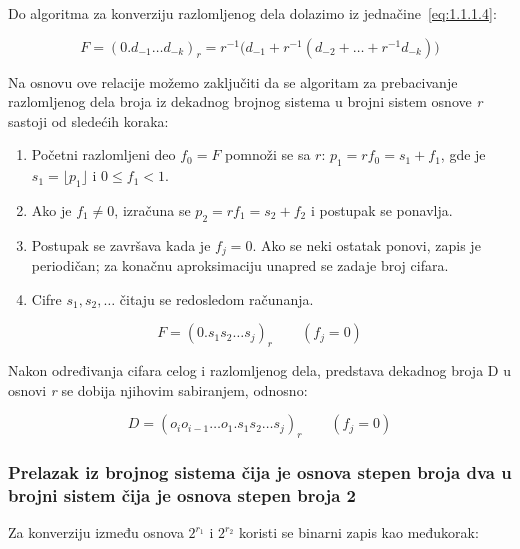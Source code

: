 \documentclass[a4paper,11pt]{article}
\numberwithin{equation}{section}
\begin{document}
Do algoritma za konverziju razlomljenog dela dolazimo iz jednačine~\eqref{eq:1.1.1.4}:

\begin{equation}\label{eq:1.1.1.7}
F=(0.d_{-1}\dots d_{-k})_r=r^{-1}\bigl(d_{-1}+r^{-1}(d_{-2}+\dots+r^{-1}d_{-k})\bigr)
\end{equation}


Na osnovu ove relacije možemo zaključiti da se algoritam za prebacivanje razlomljenog dela broja iz dekadnog brojnog sistema u brojni sistem osnove \emph{r} sastoji od sledećih koraka:



\begin{enumerate}[label=\arabic*),leftmargin=*]
\item Početni razlomljeni deo $f_0=F$ pomnoži se sa $r$: $p_1=rf_0=s_1+f_1$, gde je $s_1=\lfloor p_1\rfloor$ i $0\le f_1<1$.
\item Ako je $f_1\ne0$, izračuna se $p_2=rf_1=s_2+f_2$ i postupak se ponavlja.
\item Postupak se završava kada je $f_j=0$. Ako se neki ostatak ponovi, zapis je periodičan; za konačnu aproksimaciju unapred se zadaje broj cifara.
\item Cifre $s_1,s_2,\dots$ čitaju se redosledom računanja.
\end{enumerate}

\begin{equation}\label{eq:1.1.1.8}
F=(0.s_1s_2\dots s_j)_r\qquad(f_j=0)
\end{equation}


Nakon određivanja cifara celog i razlomljenog dela, predstava dekadnog broja D u osnovi \emph{r} se dobija njihovim sabiranjem, odnosno:



\begin{equation}\label{eq:1.1.1.9}
D=(o_io_{i-1}\dots o_1.s_1s_2\dots s_j)_r\qquad(f_j=0)
\end{equation}


\subsubsection{Prelazak iz brojnog sistema čija je osnova stepen broja dva u brojni sistem čija je osnova stepen broja 2}\label{sec:1.1.3}


Za konverziju između osnova $2^{r_1}$ i $2^{r_2}$ koristi se binarni zapis kao međukorak:
\end{document}
